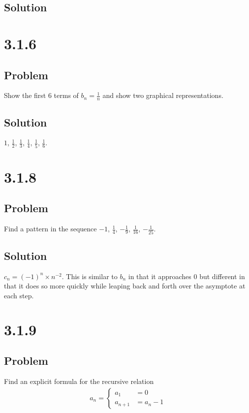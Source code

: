 \documentclass[12pt]{article}
\begin{document}
\subsection*{Solution}




\section*{3.1.6}

\subsection*{Problem}
Show the first 6 terms of $b_n = \frac{1}{n}$ and show two graphical representations.

\subsection*{Solution}
$1$, $\frac{1}{2}$, $\frac{1}{3}$, $\frac{1}{4}$, $\frac{1}{5}$, $\frac{1}{6}$.



\section*{3.1.8}

\subsection*{Problem}
Find a pattern in the sequence $-1$, $\frac{1}{4}$, $-\frac{1}{9}$, $\frac{1}{16}$, $-\frac{1}{25}$.

\subsection*{Solution}
$c_n = (-1)^n \times n^{-2}$. This is similar to $b_n$ in that it approaches 0 but different in that it does so more quickly while leaping back and forth over the asymptote at each step.



\section*{3.1.9}

\subsection*{Problem}
Find an explicit formula for the recursive relation
\begin{align*}
    a_n = \begin{cases}
        a_1 &= 0 \\
        a_{n + 1} &= a_n - 1
    \end{cases}
\end{align*}
\end{document}
